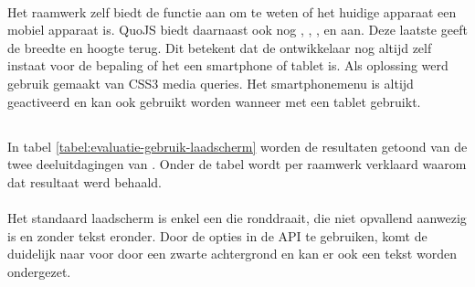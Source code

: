 \paragraph{\lungo}
Het raamwerk zelf biedt de functie  aan om te weten of het huidige apparaat een mobiel apparaat is.
QuoJS biedt daarnaast ook nog , , ,  en  aan.
Deze laatste geeft de breedte en hoogte terug.
Dit betekent dat de ontwikkelaar nog altijd zelf instaat voor de bepaling of het een smartphone of tablet is.
Als oplossing werd gebruik gemaakt van CSS3 media queries.
Het smartphonemenu is altijd geactiveerd en kan ook gebruikt worden wanneer met een tablet gebruikt.


\subsection{} 
\label{sec:evaluatie-gebruik-laadscherm}

In tabel \ref{tabel:evaluatie-gebruik-laadscherm} worden de resultaten getoond van de twee deeluitdagingen van .
Onder de tabel wordt per raamwerk verklaard waarom dat resultaat werd behaald.

\begin{table}[H]
\centering
{}
\caption{Gebruik voor }
\label{tabel:evaluatie-gebruik-laadscherm}
\end{table}

\paragraph{\jqm}
Het standaard laadscherm is enkel een  die ronddraait, die niet opvallend aanwezig is en zonder tekst eronder.
Door de opties in de API te gebruiken, komt de  duidelijk naar voor door een zwarte achtergrond en kan er ook een tekst worden ondergezet.

